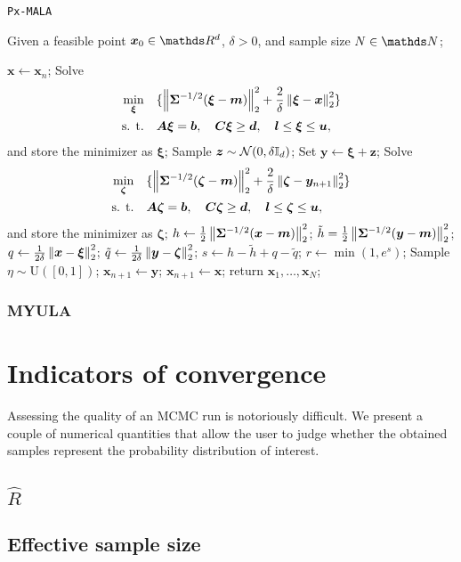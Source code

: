 \documentclass[10pt]{article}
\numberwithin{equation}{section}
\begin{document}
\begin{algorithm}[H]
\caption{\texttt{Px-MALA}}
Given a feasible point $\bm x_0 \in \R^d$, $\delta > 0$, and sample size $N \in \N$;
\begin{algorithmic}[2]\label{alg:adaptive_eki}
\State $\bm x \gets \bm x_n$;
\State Solve
\begin{align*}
\min_{\bm \xi} & \quad \lbrace \left\|\bm \Sigma^{-1/2}(\bm \xi - \bm m)\right\|_2^2 + \frac{2}{\delta} \left\|\bm \xi - \bm x\right\|_2^2 \rbrace \\
\text{s. t.} & \quad \bm A \bm \xi = \bm b, \quad \bm C \bm \xi \geq \bm d, \quad \bm l \leq \bm \xi \leq \bm u,
\end{align*}
and store the minimizer as $\bm \xi$;
\State Sample $\bm z \sim \mathcal{N}(0, \delta \mathbb{I}_d)$;
\State Set $\bm y \gets \bm \xi + \bm z$;
\State Solve
\begin{align*}
\min_{\bm \zeta} & \quad \lbrace \left\|\bm \Sigma^{-1/2}(\bm \zeta - \bm m)\right\|_2^2 + \frac{2}{\delta} \left\|\bm \zeta - \bm y_{n+1}\right\|_2^2 \rbrace \\
\text{s. t.} & \quad \bm A \bm \zeta = \bm b, \quad \bm C \bm \zeta \geq \bm d, \quad \bm l \leq \bm \zeta \leq \bm u,
\end{align*}
and store the minimizer as $\bm \zeta$;
\State $h \gets \frac{1}{2} \left\|\bm \Sigma^{-1/2}(\bm x - \bm m)\right\|_2^2$;
\State $\tilde h = \frac{1}{2} \left\|\bm \Sigma^{-1/2}(\bm y - \bm m)\right\|_2^2$;
\State $q \gets \frac{1}{2 \delta}\left\|\bm x - \bm \xi\right\|_2^2$;
\State $\tilde q \gets \frac{1}{2 \delta}\left\|\bm y - \bm \zeta\right\|_2^2$;
\State $s \gets h - \tilde h + q - \tilde q$;
\State $r \gets \min(1, e^s)$;
\State Sample $\eta \sim \mathrm{U}([0,1])$;
\State $\bm x_{n+1} \gets \bm y$;
\Else
\State $\bm x_{n+1} \gets \bm x$;
\EndIf
\EndFor
\State return $\bm x_1, \ldots, \bm x_N$;
\end{algorithmic}
\end{algorithm}


\subsubsection*{MYULA}




\section{Indicators of convergence}

Assessing the quality of an MCMC run is notoriously difficult. We present a couple of numerical quantities that allow the user to judge whether the obtained samples represent the probability distribution of interest.

\subsection{$\hat R$}

\subsection{Effective sample size}







\printbibliography
\end{document}
